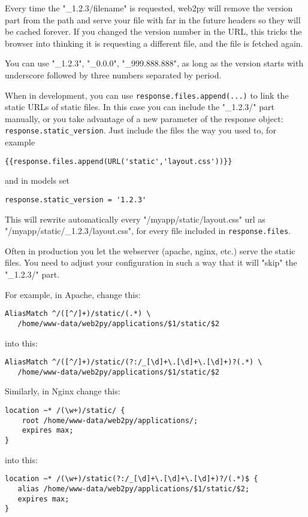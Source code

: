 \documentclass[justified,sixbynine,notoc]{tufte-book}
\def\ft{\small\tt}
\begin{document}
\begin{fullwidth}
Every time the "\_1.2.3/filename" is requested, web2py will remove the version part from the path and serve your file with far in the future headers so they will be cached forever. If you changed the version number in the URL, this tricks the browser into thinking it is requesting a different file, and the file is fetched again.

You can use "\_1.2.3", "\_0.0.0", "\_999.888.888", as long as the version starts with underscore followed by three numbers separated by period.

When in development, you can use {\ft response.files.append(...)} to link the static URLs of static files. In this case you can include the "\_1.2.3/" part manually, or you take advantage of a new parameter of the response object: {\ft response.static\_version}.
Just include the files the way you used to, for example
\begin{lstlisting}[keywords={}]
{{response.files.append(URL('static','layout.css'))}}
\end{lstlisting}
and in models set
\begin{lstlisting}
response.static_version = '1.2.3'
\end{lstlisting}
This will rewrite automatically every "/myapp/static/layout.css" url as "/myapp/static/\_1.2.3/layout.css", for every file included in {\ft response.files}.

Often in production you let the webserver (apache, nginx, etc.) serve the static files. You need to adjust your configuration in such a way that it will "skip" the "\_1.2.3/" part.

For example, in Apache, change this:
\begin{lstlisting}
AliasMatch ^/([^/]+)/static/(.*) \
   /home/www-data/web2py/applications/$1/static/$2
\end{lstlisting}
into this:
\begin{lstlisting}
AliasMatch ^/([^/]+)/static/(?:/_[\d]+\.[\d]+\.[\d]+)?(.*) \
   /home/www-data/web2py/applications/$1/static/$2
\end{lstlisting}

Similarly, in Nginx change this:
\begin{lstlisting}
location ~* /(\w+)/static/ {
    root /home/www-data/web2py/applications/;
    expires max;
}
\end{lstlisting}
into this:
\begin{lstlisting}
location ~* /(\w+)/static(?:/_[\d]+\.[\d]+\.[\d]+)?/(.*)$ {
   alias /home/www-data/web2py/applications/$1/static/$2;
   expires max;
}
\end{lstlisting}


\end{fullwidth}
\end{document}
